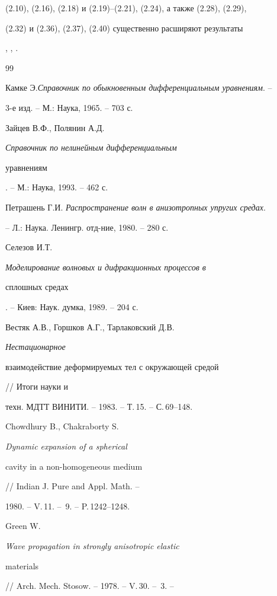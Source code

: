 (2.10), (2.16), (2.18) и (2.19)--(2.21), (2.24), а также (2.28), (2.29), 


(2.32) и (2.36), (2.37), (2.40) существенно расширяют результаты 


\cite{6}, \cite{8}, \cite{15}. 


 


\begin{thebibliography}{99} 


 




Камке Э.{\em Справочник по обыкновенным дифференциальным уравнениям}. -- 


3-е изд. -- М.: Наука, 1965. -- 703 с. 




Зайцев В.Ф., Полянин А.Д. {\em Справочник по нелинейным дифференциальным 


уравнениям}. -- М.: Наука, 1993. -- 462 с. 




Петрашень Г.И. {\em Распространение волн в анизотропных упругих средах}. 


-- Л.: Наука. Ленингр. отд-ние, 1980. -- 280 с. 




Селезов И.Т. {\em Моделирование волновых и дифракционных процессов в 


сплошных средах}. -- Киев: Наук. думка, 1989. -- 204 с. 




Вестяк А.В., Горшков А.Г., Тарлаковский Д.В. {\em Нестационарное 


взаимодействие деформируемых тел с окружающей средой} // Итоги науки и 


техн. МДТТ ВИНИТИ. -- 1983. -- Т.\,15. -- С.\,69--148. 




Chowdhury B., Chakraborty S. {\em Dynamic expansion of a spherical 


cavity in a non-homogeneous medium} // Indian J. Pure and Appl. Math. -- 


1980. -- V.\,11. -- \No\,9. -- P.\,1242--1248. 




Green W. {\em Wave propagation in strongly anisotropic elastic 


materials} // Arch. Mech. Stosow. -- 1978. -- V.\,30. -- \No\,3. -- 



\end{thebibliography}
